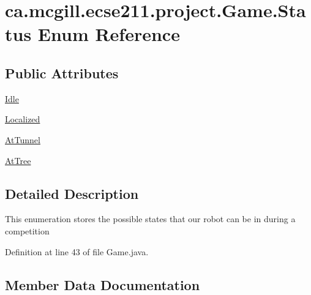 \hypertarget{enumca_1_1mcgill_1_1ecse211_1_1project_1_1_game_1_1_status}{}\section{ca.\+mcgill.\+ecse211.\+project.\+Game.\+Status Enum Reference}
\label{enumca_1_1mcgill_1_1ecse211_1_1project_1_1_game_1_1_status}
\subsection*{Public Attributes}
\begin{DoxyCompactItemize}
\item 
\hyperlink{enumca_1_1mcgill_1_1ecse211_1_1project_1_1_game_1_1_status_a4ee6ac6711e6f0f96cfbe832f260c89f}{Idle}
\item 
\hyperlink{enumca_1_1mcgill_1_1ecse211_1_1project_1_1_game_1_1_status_a7d3a789bd51e152bd2643e7214a178f8}{Localized}
\item 
\hyperlink{enumca_1_1mcgill_1_1ecse211_1_1project_1_1_game_1_1_status_a7ebcaa409a8a78b543975cca230f51a3}{At\+Tunnel}
\item 
\hyperlink{enumca_1_1mcgill_1_1ecse211_1_1project_1_1_game_1_1_status_ae3a62c62aab81b3a4ada7940139ff936}{At\+Tree}
\end{DoxyCompactItemize}


\subsection{Detailed Description}
This enumeration stores the possible states that our robot can be in during a competition 

Definition at line 43 of file Game.\+java.



\subsection{Member Data Documentation}
\mbox{\label{enumca_1_1mcgill_1_1ecse211_1_1project_1_1_game_1_1_status_ae3a62c62aab81b3a4ada7940139ff936}} 
